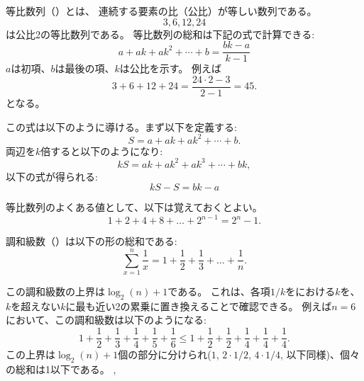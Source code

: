 等比数列（）とは、
連続する要素の比（公比）が等しい数列である。
\[3,6,12,24\]
は公比2の等比数列である。
等比数列の総和は下記の式で計算できる:
\[a + ak + ak^2 + \cdots + b = \frac{bk-a}{k-1}\]
$a$は初項、$b$は最後の項、$k$は公比を示す。
例えば
\[3+6+12+24=\frac{24 \cdot 2 - 3}{2-1} = 45.\]
となる。

\begin{comment}
This formula can be derived as follows. Let
\[ S = a + ak + ak^2 + \cdots + b .\]
By multiplying both sides by $k$, we get
\[ kS = ak + ak^2 + ak^3 + \cdots + bk,\]
and solving the equation
\[ kS-S = bk-a\]
yields the formula.

A special case of a sum of a geometric progression is the formula
\[1+2+4+8+\ldots+2^{n-1}=2^n-1.\]
\end{comment}

この式は以下のように導ける。まず以下を定義する:
\[ S = a + ak + ak^2 + \cdots + b .\]
両辺を$k$倍すると以下のようになり:
\[ kS = ak + ak^2 + ak^3 + \cdots + bk,\]
以下の式が得られる:
\[ kS-S = bk-a\]

等比数列のよくある値として、以下は覚えておくとよい。
\[1+2+4+8+\ldots+2^{n-1}=2^n-1.\]

\begin{comment}
\index{harmonic sum}

A \key{harmonic sum} is a sum of the form
\[ \sum_{x=1}^n \frac{1}{x} = 1+\frac{1}{2}+\frac{1}{3}+\ldots+\frac{1}{n}.\]

An upper bound for a harmonic sum is $\log_2(n)+1$.
Namely, we can
modify each term $1/k$ so that $k$ becomes
the nearest power of two that does not exceed $k$.
For example, when $n=6$, we can estimate
the sum as follows:
\[ 1+\frac{1}{2}+\frac{1}{3}+\frac{1}{4}+\frac{1}{5}+\frac{1}{6} \le
1+\frac{1}{2}+\frac{1}{2}+\frac{1}{4}+\frac{1}{4}+\frac{1}{4}.\]
This upper bound consists of $\log_2(n)+1$ parts
($1$, $2 \cdot 1/2$, $4 \cdot 1/4$, etc.),
and the value of each part is at most 1.
\end{comment}


調和級数（）は以下の形の総和である:
\[ \sum_{x=1}^n \frac{1}{x} = 1+\frac{1}{2}+\frac{1}{3}+\ldots+\frac{1}{n}.\]

この調和級数の上界は$\log_2(n)+1$である。
これは、各項$1/k$をにおける$k$を、$k$を超えない$k$に最も近い2の累乗に置き換えることで確認できる。
例えば$n=6$において、この調和級数は以下のようになる:
\[ 1+\frac{1}{2}+\frac{1}{3}+\frac{1}{4}+\frac{1}{5}+\frac{1}{6} \le
1+\frac{1}{2}+\frac{1}{2}+\frac{1}{4}+\frac{1}{4}+\frac{1}{4}.\]
この上界は$\log_2(n)+1$個の部分に分けられ($1$, $2 \cdot 1/2$, $4 \cdot 1/4$, 以下同様)、個々の総和は1以下である。
,

